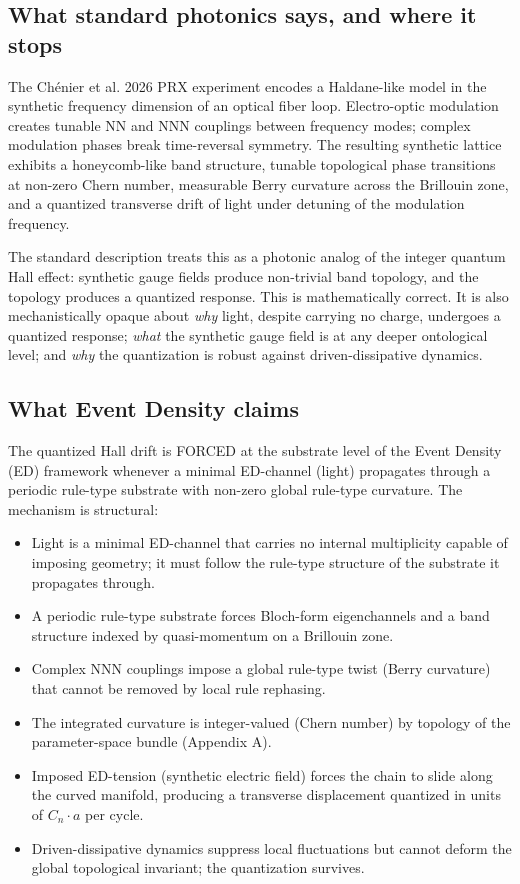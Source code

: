 \documentclass[11pt,a4paper]{article}
\begin{document}
\subsection*{What standard photonics says, and where it stops}

The Ch\'enier et al. 2026 PRX experiment encodes a Haldane-like model in the synthetic frequency dimension of an optical fiber loop. Electro-optic modulation creates tunable NN and NNN couplings between frequency modes; complex modulation phases break time-reversal symmetry. The resulting synthetic lattice exhibits a honeycomb-like band structure, tunable topological phase transitions at non-zero Chern number, measurable Berry curvature across the Brillouin zone, and a quantized transverse drift of light under detuning of the modulation frequency.

The standard description treats this as a photonic analog of the integer quantum Hall effect: synthetic gauge fields produce non-trivial band topology, and the topology produces a quantized response. This is mathematically correct. It is also mechanistically opaque about \emph{why} light, despite carrying no charge, undergoes a quantized response; \emph{what} the synthetic gauge field is at any deeper ontological level; and \emph{why} the quantization is robust against driven-dissipative dynamics.

\subsection*{What Event Density claims}

The quantized Hall drift is FORCED at the substrate level of the Event Density (ED) framework whenever a minimal ED-channel (light) propagates through a periodic rule-type substrate with non-zero global rule-type curvature. The mechanism is structural:

\begin{itemize}[noitemsep]
  \item Light is a minimal ED-channel that carries no internal multiplicity capable of imposing geometry; it must follow the rule-type structure of the substrate it propagates through.
  \item A periodic rule-type substrate forces Bloch-form eigenchannels and a band structure indexed by quasi-momentum on a Brillouin zone.
  \item Complex NNN couplings impose a global rule-type twist (Berry curvature) that cannot be removed by local rule rephasing.
  \item The integrated curvature is integer-valued (Chern number) by topology of the parameter-space bundle (Appendix A).
  \item Imposed ED-tension (synthetic electric field) forces the chain to slide along the curved manifold, producing a transverse displacement quantized in units of $C_n\cdot a$ per cycle.
  \item Driven-dissipative dynamics suppress local fluctuations but cannot deform the global topological invariant; the quantization survives.
\end{itemize}
\end{document}
